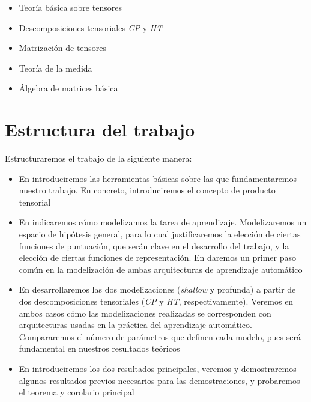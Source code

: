 \begin{itemize}
    \item Teoría básica sobre tensores
    \item Descomposiciones tensoriales \textit{CP} y \textit{HT}
    \item Matrización de tensores
    \item Teoría de la medida
    \item Álgebra de matrices básica
\end{itemize}

\section{Estructura del trabajo}

Estructuraremos el trabajo de la siguiente manera:

\begin{itemize}
    \item En  introduciremos las herramientas básicas sobre las que fundamentaremos nuestro trabajo. En concreto, introduciremos el concepto de producto tensorial
    \item En  indicaremos cómo modelizamos la tarea de aprendizaje. Modelizaremos un espacio de hipótesis general, para lo cual justificaremos la elección de ciertas funciones de puntuación, que serán clave en el desarrollo del trabajo, y la elección de ciertas funciones de representación. En  daremos un primer paso común en la modelización de ambas arquitecturas de aprendizaje automático
    \item En  desarrollaremos las dos modelizaciones (\textit{shallow} y profunda) a partir de dos descomposiciones tensoriales (\textit{CP} y \textit{HT}, respectivamente). Veremos en ambos casos cómo las modelizaciones realizadas se corresponden con arquitecturas usadas en la práctica del aprendizaje automático. Compararemos el número de parámetros que definen cada modelo, pues será fundamental en nuestros resultados teóricos
    \item En  introduciremos los dos resultados principales, veremos y demostraremos algunos resultados previos necesarios para las demostraciones, y probaremos el teorema y corolario principal
\end{itemize}

\endinput
